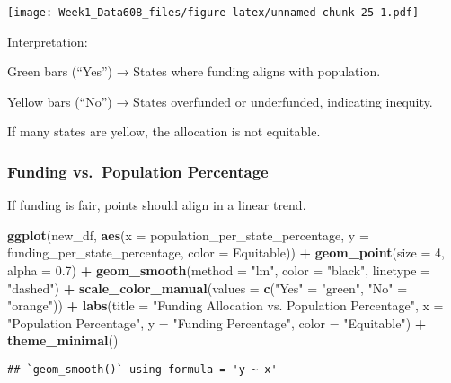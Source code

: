 \documentclass[
]{article}
\newenvironment{Shaded}{\begin{snugshade}}{\end{snugshade}}
\newcommand{\AttributeTok}[1]{\textcolor[rgb]{0.13,0.29,0.53}{#1}}
\newcommand{\DecValTok}[1]{\textcolor[rgb]{0.00,0.00,0.81}{#1}}
\newcommand{\FloatTok}[1]{\textcolor[rgb]{0.00,0.00,0.81}{#1}}
\newcommand{\FunctionTok}[1]{\textcolor[rgb]{0.13,0.29,0.53}{\textbf{#1}}}
\newcommand{\NormalTok}[1]{#1}
\newcommand{\OtherTok}[1]{\textcolor[rgb]{0.56,0.35,0.01}{#1}}
\newcommand{\SpecialCharTok}[1]{\textcolor[rgb]{0.81,0.36,0.00}{\textbf{#1}}}
\newcommand{\StringTok}[1]{\textcolor[rgb]{0.31,0.60,0.02}{#1}}
\begin{document}
\texttt{[image: Week1\_Data608\_files/figure-latex/unnamed-chunk-25-1.pdf]}

Interpretation:

Green bars (``Yes'') → States where funding aligns with population.

Yellow bars (``No'') → States overfunded or underfunded, indicating
inequity.

If many states are yellow, the allocation is not equitable.

\subsubsection{Funding vs.~Population
Percentage}\label{funding-vs.-population-percentage}

If funding is fair, points should align in a linear trend.

\begin{Shaded}
\begin{Highlighting}[]
\FunctionTok{ggplot}\NormalTok{(new\_df, }\FunctionTok{aes}\NormalTok{(}\AttributeTok{x =}\NormalTok{ population\_per\_state\_percentage, }
                   \AttributeTok{y =}\NormalTok{ funding\_per\_state\_percentage, }
                   \AttributeTok{color =}\NormalTok{ Equitable)) }\SpecialCharTok{+}
  \FunctionTok{geom\_point}\NormalTok{(}\AttributeTok{size =} \DecValTok{4}\NormalTok{, }\AttributeTok{alpha =} \FloatTok{0.7}\NormalTok{) }\SpecialCharTok{+}
  \FunctionTok{geom\_smooth}\NormalTok{(}\AttributeTok{method =} \StringTok{"lm"}\NormalTok{, }\AttributeTok{color =} \StringTok{"black"}\NormalTok{, }\AttributeTok{linetype =} \StringTok{"dashed"}\NormalTok{) }\SpecialCharTok{+}
  \FunctionTok{scale\_color\_manual}\NormalTok{(}\AttributeTok{values =} \FunctionTok{c}\NormalTok{(}\StringTok{"Yes"} \OtherTok{=} \StringTok{"green"}\NormalTok{, }\StringTok{"No"} \OtherTok{=} \StringTok{"orange"}\NormalTok{)) }\SpecialCharTok{+}
  \FunctionTok{labs}\NormalTok{(}\AttributeTok{title =} \StringTok{"Funding Allocation vs. Population Percentage"}\NormalTok{,}
       \AttributeTok{x =} \StringTok{"Population Percentage"}\NormalTok{,}
       \AttributeTok{y =} \StringTok{"Funding Percentage"}\NormalTok{,}
       \AttributeTok{color =} \StringTok{"Equitable"}\NormalTok{) }\SpecialCharTok{+}
  \FunctionTok{theme\_minimal}\NormalTok{()}
\end{Highlighting}
\end{Shaded}

\begin{verbatim}
## `geom_smooth()` using formula = 'y ~ x'
\end{verbatim}
\end{document}
